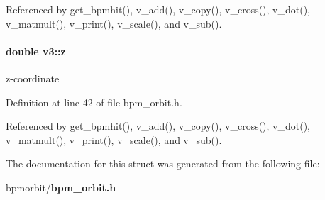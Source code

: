 Referenced by get\_\-bpmhit(), v\_\-add(), v\_\-copy(), v\_\-cross(), v\_\-dot(), v\_\-matmult(), v\_\-print(), v\_\-scale(), and v\_\-sub().
\paragraph[z]{\setlength{\rightskip}{0pt plus 5cm}double {\bf v3::z}}\hfill\label{structv3_f18ef7bf6197ad38cca46cad49d6636a}


z-coordinate 

Definition at line 42 of file bpm\_\-orbit.h.

Referenced by get\_\-bpmhit(), v\_\-add(), v\_\-copy(), v\_\-cross(), v\_\-dot(), v\_\-matmult(), v\_\-print(), v\_\-scale(), and v\_\-sub().

The documentation for this struct was generated from the following file:\begin{CompactItemize}
\item 
bpmorbit/{\bf bpm\_\-orbit.h}\end{CompactItemize}

